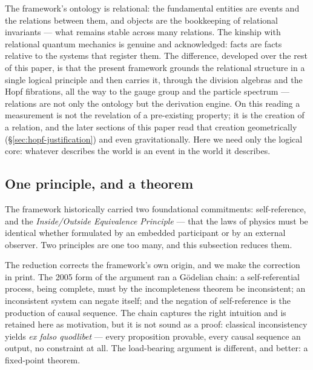 The framework's ontology is relational: the fundamental entities are events and the relations
between them, and objects are the bookkeeping of relational invariants --- what remains stable
across many relations. The kinship with relational quantum mechanics \autocite{Rovelli1996a} is
genuine and acknowledged: facts are facts relative to the systems that register them. The
difference, developed over the rest of this paper, is that the present framework grounds the
relational structure in a single logical principle and then carries it, through the division
algebras and the Hopf fibrations, all the way to the gauge group and the particle spectrum ---
relations are not only the ontology but the derivation engine. On this reading a measurement is not
the revelation of a pre-existing property; it is the creation of a relation, and the later sections
of this paper read that creation geometrically (\S\ref{sec:hopf-justification}) and even
gravitationally. Here we need only the logical core: whatever describes the world is an event in
the world it describes.

\subsection{One principle, and a theorem}

The framework historically carried two foundational commitments: self-reference, and the
\emph{Inside/Outside Equivalence Principle} --- that the laws of physics must be identical whether
formulated by an embedded participant or by an external observer. Two principles are one too many,
and this subsection reduces them.

The reduction corrects the framework's own origin, and we make the correction in print. The 2005
form of the argument \autocite{small_2006} ran a G\"{o}delian chain: a self-referential process,
being complete, must by the incompleteness theorem \autocite{Godel1931} be inconsistent; an
inconsistent system can negate itself; and the negation of self-reference is the production of
causal sequence. The chain captures the right intuition and is retained here as motivation, but it
is not sound as a proof: classical inconsistency yields \emph{ex falso quodlibet} --- every
proposition provable, every causal sequence an output, no constraint at all. The load-bearing
argument is different, and better: a fixed-point theorem.

